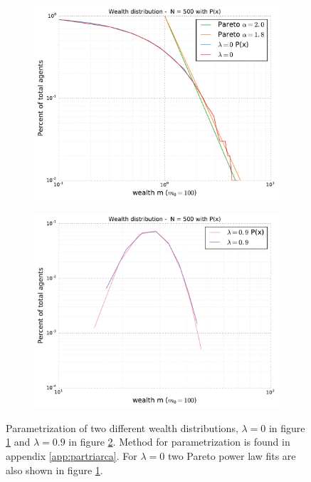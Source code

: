 \documentclass[10pt, a4paper]{amsart}
\begin{document}
\begin{figure}
\begin{subfigure}{.5\textwidth}
  \centering
  \includegraphics[width=\linewidth]{../figures/5ac/5c_parameterization0.pdf}
  \caption{}
  \label{fig:paramfig1}
\end{subfigure}%
\begin{subfigure}{.5\textwidth}
  \centering
  \includegraphics[width=\linewidth]{../figures/5ac/5c_parameterization09.pdf}
  \caption{}
  \label{fig:paramfig2}
\end{subfigure}
\caption{Parametrization of two different wealth distributions, $\lambda=0$ in figure \ref{fig:paramfig1} and $\lambda=0.9$ in figure \ref{fig:paramfig2}. Method for parametrization is found in appendix \ref{app:partriarca}. For $\lambda=0$ two Pareto power law fits are also shown in figure \ref{fig:paramfig1}.}
\label{fig:paramfig}
\end{figure}
\end{document}

